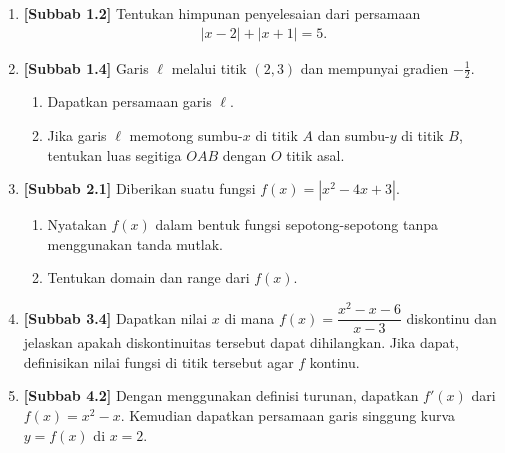 \documentclass[10pt,openany,a4paper]{article}
\theoremstyle{definition}
\theoremstyle{definition}
\theoremstyle{plain}
\begin{document}
\newpage

\begin{enumerate}
    \item \textbf{[Subbab 1.2]} Tentukan himpunan penyelesaian dari persamaan
    \begin{align*}
        |x-2|+|x+1|=5.
    \end{align*}

    \item \textbf{[Subbab 1.4]} Garis $\ell$ melalui titik $(2,3)$ dan mempunyai gradien $-\frac{1}{2}$.
    \begin{enumerate}
        \item Dapatkan persamaan garis $\ell$.
        \item Jika garis $\ell$ memotong sumbu-$x$ di titik $A$ dan sumbu-$y$ di titik $B$, tentukan luas segitiga $OAB$ dengan $O$ titik asal.
    \end{enumerate}

    \item \textbf{[Subbab 2.1]} Diberikan suatu fungsi $f(x)=\left|x^2-4x+3\right|$.
    \begin{enumerate}
        \item Nyatakan $f(x)$ dalam bentuk fungsi sepotong-sepotong tanpa menggunakan tanda mutlak.
        \item Tentukan domain dan range dari $f(x)$.
    \end{enumerate}

    \item \textbf{[Subbab 3.4]} Dapatkan nilai $x$ di mana $f(x)=\dfrac{x^2-x-6}{x-3}$ diskontinu dan jelaskan apakah diskontinuitas tersebut dapat dihilangkan. Jika dapat, definisikan nilai fungsi di titik tersebut agar $f$ kontinu.

    \item \textbf{[Subbab 4.2]} Dengan menggunakan definisi turunan, dapatkan $f'(x)$ dari $f(x)=x^2-x$. Kemudian dapatkan persamaan garis singgung kurva $y=f(x)$ di $x=2$.
\end{enumerate}

\newpage
\end{document}
